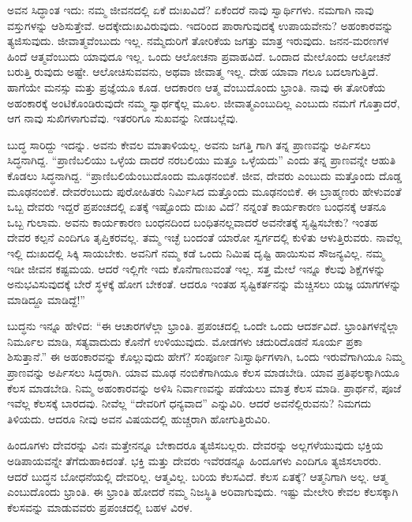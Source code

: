 ಅವನ ಸಿದ್ಧಾಂತ ಇದು: ನಮ್ಮ ಜೀವನದಲ್ಲಿ ಏಕೆ ದುಃಖವಿದೆ? ಏಕೆಂದರೆ ನಾವು ಸ್ವಾರ್ಥಿಗಳು. ನಮಗಾಗಿ ನಾವು ವಸ್ತುಗಳನ್ನು ಆಶಿಸುತ್ತೇವೆ. ಅದಕ್ಕೇದುಃಖವಿರುವುದು. ಇದರಿಂದ ಪಾರಾಗುವುದಕ್ಕೆ ಉಪಾಯವೇನು? ಅಹಂಕಾರವನ್ನು ತ್ಯಜಿಸುವುದು. ಜೀವಾತ್ಮವೆಂಬುದು ಇಲ್ಲ. ನಮ್ಮೆದುರಿಗೆ ತೋರಿಕೆಯ ಜಗತ್ತು ಮಾತ್ರ ಇರುವುದು. ಜನನ-ಮರಣಗಳ ಹಿಂದೆ ಆತ್ಮವೆಂಬುದು ಯಾವುದೂ ಇಲ್ಲ. ಒಂದು ಆಲೋಚನಾ ಪ್ರವಾಹವಿದೆ. ಒಂದಾದ ಮೇಲೊಂದು ಆಲೋಚನೆ ಬರುತ್ತಿ ರುವುದು ಅಷ್ಟೇ. ಆಲೋಚಿಸುವವನು, ಅಥವಾ ಜೀವಾತ್ಮ ಇಲ್ಲ. ದೇಹ ಯಾವಾ ಗಲೂ ಬದಲಾಗುತ್ತಿದೆ. ಹಾಗೆಯೇ ಮನಸ್ಸು ಮತ್ತು ಪ್ರಜ್ಞೆಯೂ ಕೂಡ. ಆದಕಾರಣ ಆತ್ಮ ವೆಂಬುದೊಂದು ಭ್ರಾಂತಿ. ನಾವು ಈ ತೋರಿಕೆಯ ಅಹಂಕಾರಕ್ಕೆ ಅಂಟಿಕೊಂಡಿರುವುದೇ ನಮ್ಮ ಸ್ವಾರ್ಥಕ್ಕೆಲ್ಲ ಮೂಲ. ಜೀವಾತ್ಮಎಂಬುದಿಲ್ಲ ಎಂಬುದು ನಮಗೆ ಗೊತ್ತಾದರೆ, ಆಗ ನಾವು ಸುಖಿಗಳಾಗುವೆವು. ಇತರರಿಗೂ ಸುಖವನ್ನು ನೀಡಬಲ್ಲೆವು.

ಬುದ್ಧ ಸಾರಿದ್ದು ಇದನ್ನು. ಅವನು ಕೇವಲ ಮಾತಾಳಿಯಲ್ಲ. ಅವನು ಜಗತ್ತಿ ಗಾಗಿ ತನ್ನ ಪ್ರಾಣವನ್ನು ಅರ್ಪಿಸಲು ಸಿದ್ಧನಾಗಿದ್ದ. “ಪ್ರಾಣಿಬಲಿಯು ಒಳ್ಳೆಯ ದಾದರೆ ನರಬಲಿಯು ಮತ್ತೂ ಒಳ್ಳೆಯದು” ಎಂದು ತನ್ನ ಪ್ರಾಣವನ್ನೇ ಆಹುತಿ ಕೊಡಲು ಸಿದ್ಧನಾಗಿದ್ದ. “ಪ್ರಾಣಿಬಲಿಯೆಂಬುದೊಂದು ಮೂಢನಂಬಿಕೆ. ಜೀವ, ದೇವರು ಎಂಬುದು ಮತ್ತೊಂದು ದೊಡ್ಡ ಮೂಢನಂಬಿಕೆ. ದೇವರೆಂಬುದು ಪುರೋಹಿತರು ನಿರ್ಮಿಸಿದ ಮತ್ತೊಂದು ಮೂಢನಂಬಿಕೆ. ಈ ಬ್ರಾಹ್ಮಣರು ಹೇಳುವಂತೆ ಒಬ್ಬ ದೇವರು ಇದ್ದರೆ ಪ್ರಪಂಚದಲ್ಲಿ ಏತಕ್ಕೆ ಇಷ್ಟೊಂದು ದುಃಖ ವಿದೆ? ನನ್ನಂತೆ ಕಾರ್ಯಕಾರಣ ಬಂಧನಕ್ಕೆ ಆತನೂ ಒಬ್ಬ ಗುಲಾಮ. ಅವನು ಕಾರ್ಯಕಾರಣ ಬಂಧನದಿಂದ ಬಂಧಿತನಲ್ಲವಾದರೆ ಅವನೇತಕ್ಕೆ ಸೃಷ್ಟಿಸಬೇಕು? ಇಂತಹ ದೇವರ ಕಲ್ಪನೆ ಎಂದಿಗೂ ತೃಪ್ತಿಕರವಲ್ಲ. ತಮ್ಮ ಇಚ್ಛೆ ಬಂದಂತೆ ಯಾರೋ ಸ್ವರ್ಗದಲ್ಲಿ ಕುಳಿತು ಆಳುತ್ತಿರುವರು. ನಾವೆಲ್ಲ ಇಲ್ಲಿ ದುಃಖದಲ್ಲಿ ಸಿಕ್ಕಿ ಸಾಯಬೇಕು. ಅವನಿಗೆ ನಮ್ಮ ಕಡೆ ಒಂದು ನಿಮಿಷ ದೃಷ್ಟಿ ಹಾಯಿಸುವ ಸೌಜನ್ಯವಿಲ್ಲ. ನಮ್ಮ ಇಡೀ ಜೀವನ ಕಷ್ಟಮಯ. ಆದರೆ ಇಲ್ಲಿಗೇ ಇದು ಕೊನೆಗಾಣುವಂತೆ ಇಲ್ಲ. ಸತ್ತ ಮೇಲೆ ಇನ್ನೂ ಕೆಲವು ಶಿಕ್ಷೆಗಳನ್ನು ಅನುಭವಿಸುವುದಕ್ಕೆ ಬೇರೆ ಸ್ಥಳಕ್ಕೆ ಹೋಗ ಬೇಕಂತೆ. ಆದರೂ ಇಂತಹ ಸೃಷ್ಟಿಕರ್ತನನ್ನು ಮೆಚ್ಚಿಸಲು ಯಜ್ಞ ಯಾಗಗಳನ್ನು ಮಾಡಿದ್ದೂ ಮಾಡಿದ್ದೆ!”

ಬುದ್ಧನು ಇನ್ನೂ ಹೇಳಿದ: “ಈ ಆಚಾರಗಳೆಲ್ಲಾ ಭ್ರಾಂತಿ. ಪ್ರಪಂಚದಲ್ಲಿ ಒಂದೇ ಒಂದು ಆದರ್ಶವಿದೆ. ಭ್ರಾಂತಿಗಳನ್ನೆಲ್ಲಾ ನಿರ್ಮೂಲ ಮಾಡಿ, ಸತ್ಯವಾದುದು ಕೊನೆಗೆ ಉಳಿಯುವುದು. ಮೋಡಗಳು ಚದುರಿದೊಡನೆ ಸೂರ್ಯ ಪ್ರಕಾ ಶಿಸುತ್ತಾನೆ.” ಈ ಅಹಂಕಾರವನ್ನು ಕೊಲ್ಲುವುದು ಹೇಗೆ? ಸಂಪೂರ್ಣ ನಿಃಸ್ವಾರ್ಥಿಗಳಾಗಿ, ಒಂದು ಇರುವೆಗಾಗಿಯೂ ನಿಮ್ಮ ಪ್ರಾಣವನ್ನು ಅರ್ಪಿಸಲು ಸಿದ್ಧರಾಗಿ. ಯಾವ ಮೂಢ ನಂಬಿಕೆಗಾಗಿಯೂ ಕೆಲಸ ಮಾಡಬೇಡಿ. ಯಾವ ಪ್ರತಿಫಲಕ್ಕಾಗಿಯೂ ಕೆಲಸ ಮಾಡಬೇಡಿ. ನಿಮ್ಮ ಅಹಂಕಾರವನ್ನು ಅಳಿಸಿ ನಿರ್ವಾಣವನ್ನು ಪಡೆಯಲು ಮಾತ್ರ ಕೆಲಸ ಮಾಡಿ. ಪ್ರಾರ್ಥನೆ, ಪೂಜೆ ಇವೆಲ್ಲ ಕೆಲಸಕ್ಕೆ ಬಾರದವು. ನೀವೆಲ್ಲ “ದೇವರಿಗೆ ಧನ್ಯವಾದ” ಎನ್ನುವಿರಿ. ಆದರೆ ಅವನೆಲ್ಲಿರುವನು? ನಿಮಗದು ತಿಳಿಯದು. ಆದರೂ ನೀವು ಅವನ ವಿಷಯದಲ್ಲಿ ಹುಚ್ಚರಾಗಿ ಹೋಗುತ್ತಿರುವಿರಿ.

ಹಿಂದೂಗಳು ದೇವರನ್ನು ವಿನಃ ಮತ್ತೇನನ್ನೂ ಬೇಕಾದರೂ ತ್ಯಜಿಸಬಲ್ಲರು. ದೇವರನ್ನು ಅಲ್ಲಗಳೆಯುವುದು ಭಕ್ತಿಯ ಅಡಿಪಾಯವನ್ನೇ ತೆಗೆದುಹಾಕಿದಂತೆ. ಭಕ್ತಿ ಮತ್ತು ದೇವರು ಇವೆರಡನ್ನೂ ಹಿಂದೂಗಳು ಎಂದಿಗೂ ತ್ಯಜಿಸಲಾರರು. ಆದರೆ ಬುದ್ಧನ ಬೋಧನೆಯಲ್ಲಿ ದೇವರಿಲ್ಲ. ಆತ್ಮವಿಲ್ಲ. ಬರಿಯ ಕೆಲಸವಿದೆ. ಕೆಲಸ ಏತಕ್ಕೆ? ಆತ್ಮನಿಗಾಗಿ ಅಲ್ಲ. ಆತ್ಮ ಎಂಬುದೊಂದು ಭ್ರಾಂತಿ. ಈ ಭ್ರಾಂತಿ ಹೋದರೆ ನಮ್ಮ ನಿಜಸ್ಥಿತಿ ಅರಿವಾಗುವುದು. ಇಷ್ಟು ಮೇಲೇರಿ ಕೇವಲ ಕೆಲಸಕ್ಕಾಗಿ ಕೆಲಸವನ್ನು ಮಾಡುವವರು ಪ್ರಪಂಚದಲ್ಲಿ ಬಹಳ ವಿರಳ.

